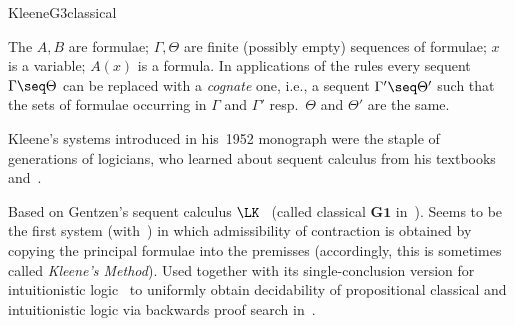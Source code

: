 \begin{entry}{KleeneG3classical}

\begin{clarifications}
  The $A,B$ are formulae; $\Gamma,\Theta$ are finite (possibly empty)
  sequences of formulae; $x$ is a variable; $A(x)$ is a formula. In
  applications of the rules every sequent $\Gamma \seq \Theta$ can be
  replaced with a \emph{cognate} one, i.e., a sequent
  $\Gamma' \seq \Theta'$ such that the sets of formulae occurring in
  $\Gamma$ and $\Gamma'$ resp.\ $\Theta$ and $\Theta'$ are the same.
\end{clarifications}

\begin{history}
  Kleene's systems introduced in his~1952 monograph were the staple of
  generations of logicians, who learned about sequent calculus from
  his textbooks~\cite{Kleene:1952} and~\cite{Kleene:1967}.
\end{history}

\begin{technicalities}
  Based on Gentzen's sequent calculus $\LK$~ (called
  classical $\mathbf{G1}$ in~\cite{Kleene:1952}). Seems to be the
  first system (with~) in which
  admissibility of contraction is obtained by copying the principal
  formulae into the premisses (accordingly, this is sometimes called
  \emph{Kleene's Method}). Used together with its single-conclusion
  version for intuitionistic logic~ to
  uniformly obtain decidability of propositional classical and
  intuitionistic logic via backwards proof search
  in~\cite{Kleene:1952}.
\end{technicalities}




\end{entry}
